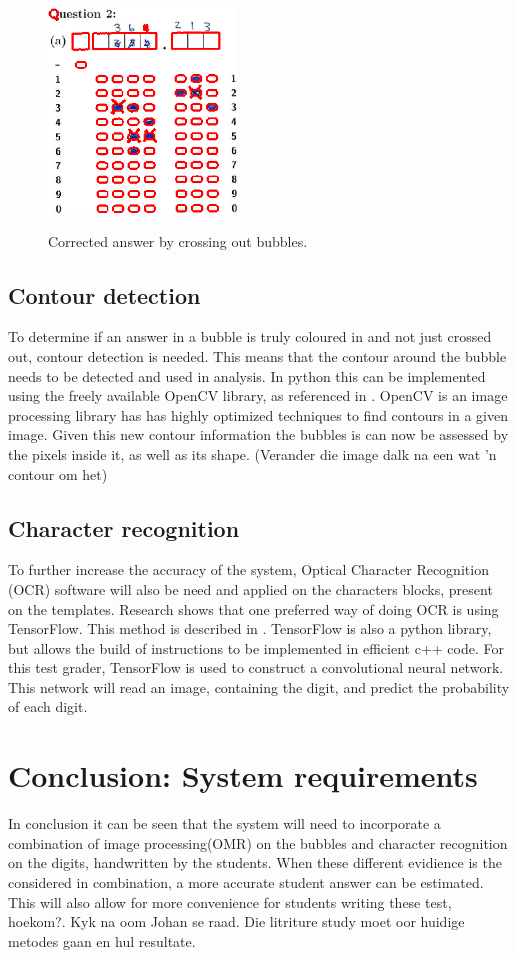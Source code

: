 \begin{figure}
  \centering
  \includegraphics[width=5cm]{Cross}\\
  \caption{Corrected answer by crossing out bubbles.}
  \label{fig:Cross}
\end{figure}

\subsection{Contour detection}
To determine if an answer in a bubble is truly coloured in and not just crossed out, contour detection is needed. This means that the contour around the bubble needs to be detected and used in analysis. In python this can be implemented using the freely available OpenCV library, as referenced in \citet{AdrianR2016}. OpenCV is an image processing library has has highly optimized techniques to find contours in a given image. Given this new contour information the bubbles is can now be assessed by the pixels inside it, as well as its shape. (Verander die image dalk na een wat 'n contour om het)

\subsection{Character recognition}
To further increase the accuracy of the system, Optical Character Recognition (OCR) software will also be need and applied on the characters blocks, present on the templates. Research shows that one preferred way of doing OCR is using TensorFlow. This method is described in \citet{Tensor}. TensorFlow is also a python library, but allows the build of instructions to be implemented in ef{f}icient c++ code. For this test grader, TensorFlow is used to construct a convolutional neural network. This network will read an image, containing the digit, and predict the probability of each digit.

\section{Conclusion: System requirements}

In conclusion it can be seen that the system will need to incorporate a combination of image processing(OMR) on the bubbles and character recognition on the digits, handwritten by the students. When these dif{f}erent evidience is the considered in combination, a more accurate student answer can be estimated. This will also allow for more convenience for students writing these test, hoekom?. Kyk na oom Johan se raad. Die litriture study moet oor huidige metodes gaan en hul resultate.
